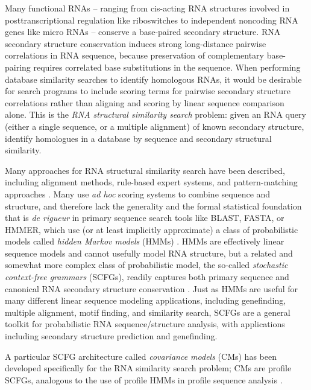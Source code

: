 \documentclass[11pt]{article}
\begin{document}
Many functional RNAs -- ranging from cis-acting RNA structures
involved in posttranscriptional regulation like riboswitches to
independent noncoding RNA genes like micro RNAs -- conserve a
base-paired secondary structure. RNA secondary structure conservation
induces strong long-distance pairwise correlations in RNA sequence,
because preservation of complementary base-pairing requires correlated
base substitutions in the sequence. When performing database
similarity searches to identify homologous RNAs, it would be desirable
for search programs to include scoring terms for pairwise secondary
structure correlations rather than aligning and scoring by linear
sequence comparison alone. This is the \emph{RNA structural similarity
search} problem: given an RNA query (either a single sequence, or a
multiple alignment) of known secondary structure, identify homologues
in a database by sequence and secondary structural similarity.

Many approaches for RNA structural similarity search have been
described, including alignment methods, rule-based expert systems, and
pattern-matching approaches \cite{Macke01,Gautheret01}. Many use
\emph{ad hoc} scoring systems to combine sequence and structure, and
therefore lack the generality and the formal statistical foundation
that is \emph{de rigueur} in primary sequence search tools like BLAST, 
FASTA, or HMMER, which use (or at least implicitly approximate) a
class of probabilistic models called \emph{hidden Markov models}
(HMMs) \cite{Durbin98}. HMMs are effectively linear sequence models
and cannot usefully model RNA structure, but a related and somewhat
more complex class of probabilistic model, the so-called
\emph{stochastic context-free grammars} (SCFGs), readily captures both
primary sequence and canonical RNA secondary structure conservation
\cite{Sakakibara94c,Durbin98}. Just as HMMs are useful for many
different linear sequence modeling applications, including
genefinding, multiple alignment, motif finding, and similarity search,
SCFGs are a general toolkit for probabilistic RNA sequence/structure
analysis, with applications including secondary structure prediction
and genefinding.

A particular SCFG architecture called \emph{covariance models} (CMs)
has been developed specifically for the RNA similarity search problem;
CMs are profile SCFGs, analogous to the use of profile HMMs in profile
sequence analysis \cite{Eddy94,Eddy02b}.
\end{document}
